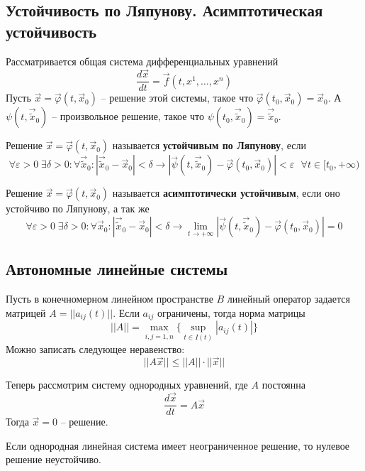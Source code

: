 \subsection{Устойчивость по Ляпунову. Асимптотическая устойчивость}
Рассматривается общая система дифференциальных уравнений
\begin{equation}
	\frac{d\vec{x}}{dt} = \vec{f}(t, x^1, \dots, x^n)
\end{equation}
Пусть $\vec{x} = \vec{\varphi}(t, \vec{x}_0)$ -- решение этой системы, такое что $\vec{\varphi}(t_0, \vec{x}_0) = \vec{x}_0$. А $\psi(t, \vec{\tilde{x}}_0)$ -- произвольное решение, такое что $\psi(t_0, \vec{\tilde{x}}_0) = \vec{\tilde{x}}_0$.
\begin{definition}
	Решение $\vec{x} = \vec{\varphi}(t, \vec{x}_0)$ называется \textbf{устойчивым по Ляпунову}, если
	\[
	\forall \varepsilon > 0 \; \exists \delta > 0:\forall \vec{\tilde{x}}_0: |\vec{\tilde{x}}_0 - \vec{x}_0|<\delta \to |\vec{\psi}(t, \vec{\tilde{x}}_0) -  \vec{\varphi}(t_0, \vec{x}_0)|<\varepsilon\text{ } \forall t\in [t_0, +\infty)
	\]
\end{definition}

\begin{definition}
	Решение $\vec{x} = \vec{\varphi}(t, \vec{x}_0)$ называется \textbf{асимптотически устойчивым}, если оно устойчиво по Ляпунову, а так же
	\[
	\forall \varepsilon > 0 \; \exists \delta > 0:\forall \vec{x}_0: |\vec{\tilde{x}}_0 - \vec{x}_0|<\delta \to \lim_{t\to+\infty}|\vec{\psi}(t, \vec{\tilde{x}}_0) -  \vec{\varphi}(t_0, \vec{x}_0)|=0
	\]
\end{definition}

\subsection{Автономные линейные системы}

Пусть в конечномерном линейном пространстве $B$ линейный оператор задается матрицей $A=||a_{ij}(t)||$. Если $a_{ij}$ ограничены, тогда норма матрицы 
\[
||A|| = \max_{i,j =\overline{1,n}}\big\{\sup_{t\in I(t)}|a_{ij}(t)|\big\}
\]
Можно записать следующее неравенство:
\[
||A\vec{x}||\leqslant ||A||\cdot||\vec{x}||
\]

Теперь рассмотрим систему однородных уравнений, где $A$ постоянна
\begin{equation}
	\frac{d\vec{x}}{dt} = A\vec{x}
	\label{equ:issue12sys}
\end{equation}
Тогда $\vec{x} = 0$ -- решение.

\begin{lemma}
	Если однородная линейная система имеет неограниченное решение, то нулевое решение неустойчиво.
\end{lemma}

